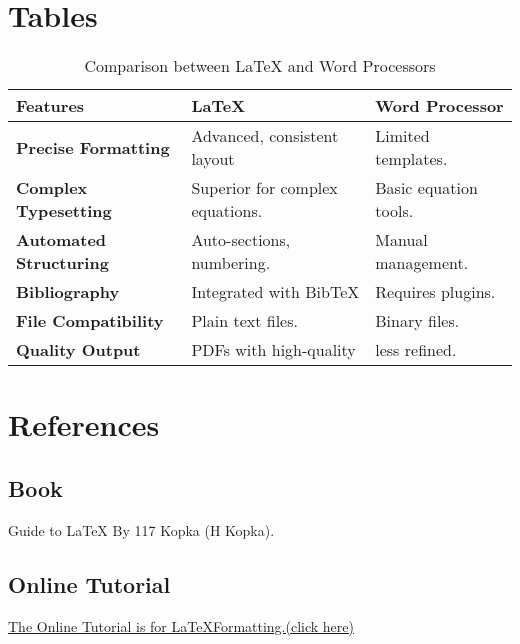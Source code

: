 \documentclass[12pt,a4paper]{article}
\begin{document}
	\section{Tables}
	\begin{table}[h]
		
		\centering
		\begin{tabular}{|l|l|l|}
			\hline\hline
			\textbf{Features} & \textbf{\LaTeX} & \textbf{Word Processor}\\
			\hline 
			\hline
			\textbf{Precise Formatting}&Advanced, consistent layout& Limited templates.\\
			\hline 
			\textbf{Complex Typesetting}&Superior for complex equations.&Basic equation tools.\\
			\hline   
			\textbf{Automated Structuring}&Auto-sections, numbering.&Manual management.  \\
			\hline   
			\textbf{Bibliography}&Integrated with BibTeX &Requires plugins. \\
			\hline
			\textbf{File Compatibility}&Plain text files.&Binary files.\\
			\hline
			\textbf{Quality Output}&PDFs with high-quality&less refined.\\
			\hline
			
		\end{tabular}
		\caption{Comparison between LaTeX and Word Processors}
		\label{tab:my_label}
	\end{table}
	\section*{References}
	\subsection*{Book}
	Guide to LaTeX By 117 Kopka (H Kopka).
	\subsection*{Online Tutorial}
	\href{https://www.youtube.com/watch?v=7B7ytLrMTa0&t=303s&ab_channel=Dr.TreforBazett}{The Online Tutorial is for \LaTeX \space Formatting.(click here)}
	
\end{document}
